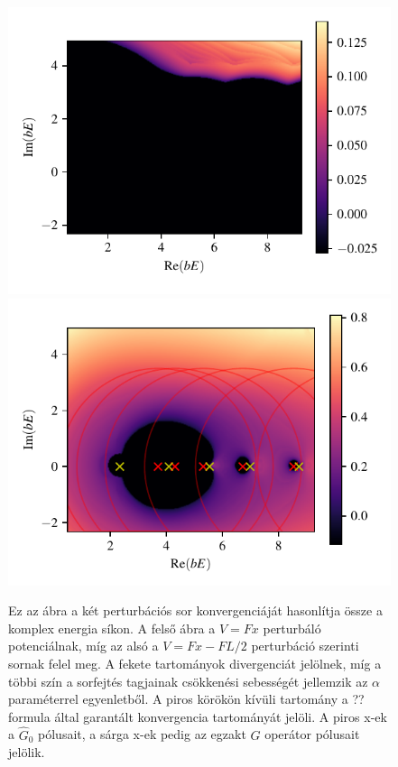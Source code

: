 \begin{figure}[H]
	\centering
	\includegraphics[scale=1]{./figs/convergenceOriginal.pdf}
	\includegraphics[scale=1]{./figs/convergenceImproved.pdf}
	\caption[A Green-függvény perturbációs sorának konvergenciatartománya]{Ez az ábra a két perturbációs sor konvergenciáját hasonlítja össze a komplex energia síkon. A felső ábra a $V=Fx$ perturbáló potenciálnak, míg az alsó a $V = Fx-FL/2$ perturbáció szerinti sornak felel meg. A fekete tartományok divergenciát jelölnek, míg a többi szín a sorfejtés tagjainak csökkenési sebességét jellemzik az $\alpha$ paraméterrel  egyenletből. A piros körökön kívüli tartomány a ?? formula által garantált konvergencia tartományát jelöli. A piros x-ek a $\hat{G}_0$ pólusait, a sárga x-ek pedig az egzakt $\hat{G}$ operátor pólusait jelölik.}
\end{figure}